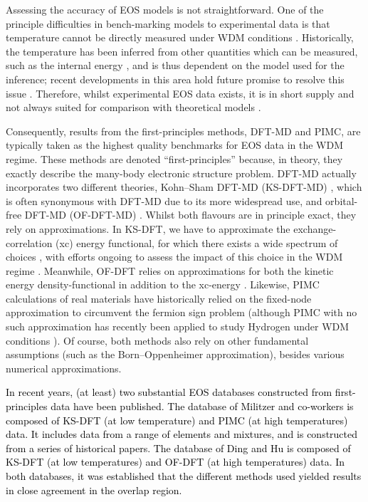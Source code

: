 \documentclass[%
 preprint,
 superscriptaddress,
 amsmath,amssymb,
longbibliography,
]{revtex4-2}
\newcommand{\change}[1]{\textcolor{black}{#1}}
\begin{document}
Assessing the accuracy of EOS models is not straightforward. One of the principle difficulties in bench-marking models to experimental data is that temperature cannot be directly measured under WDM conditions \cite{Expt_EOS_database,Kraus_XRTS,Dornheim_temperature}. Historically, the temperature has been inferred from other quantities which can be measured, such as the internal energy \cite{Expt_EOS_database}, and is thus dependent on the model used for the inference; recent developments in this area hold future promise to resolve this issue \cite{moldabekov2022_thermal,Dornheim_temperature, dornheim_imaginary-time}. Therefore, whilst experimental EOS data exists, it is in short supply and not always suited for comparison with theoretical models \cite{Expt_EOS_database}.

Consequently, results from the first-principles methods, DFT-MD and PIMC, are typically taken as the highest quality benchmarks for EOS data in the WDM regime. These methods are denoted ``first-principles'' because, in theory, they exactly describe the many-body electronic structure problem. DFT-MD actually incorporates two different theories, Kohn--Sham DFT-MD (KS-DFT-MD) \cite{ks65}, which is often synonymous with DFT-MD due to its more widespread use, and orbital-free DFT-MD (OF-DFT-MD) \cite{Carter_OFDFT_intro}. Whilst both flavours are in principle exact, they rely on approximations. In KS-DFT, we have to approximate the exchange-correlation (xc) energy functional, for which there exists a wide spectrum of choices \cite{Jacobs_ladder,Cohen_Yang_challenges,XC_review}, with efforts ongoing to assess the impact of this choice in the WDM regime \cite{Karasiev_XC,Kushal_Hydrogen,Aurora_XC_1,Aurora_XC_2,Zhandos_XC_1,Zhandos_XC_2,Callow_AA_22, moldabekov2023_assessing, moldabekov2023_non-empirical}. Meanwhile, OF-DFT relies on approximations for both the kinetic energy density-functional in addition to the xc-energy \cite{Trickey_ODDFT_challenges,Trickey_OFDFT_GGA,Levy_OFDFT,Finzel_2019,Ludena_Pauli}. Likewise, PIMC calculations of real materials have historically relied on the fixed-node approximation \cite{Ceperley1991} to circumvent the fermion sign problem \cite{Troyer_fermion_sign} (although PIMC with no such approximation has recently been applied to study Hydrogen under WDM conditions \cite{Dornheim_Hydrogen_22}). Of course, both methods also rely on other fundamental assumptions (such as the Born--Oppenheimer approximation), besides various numerical approximations. 

\change{In recent years, (at least) two substantial EOS databases constructed from first-principles data have been published. The database of Militzer and co-workers \cite{Militzer_EOS_database} is composed of KS-DFT (at low temperature) and PIMC (at high temperatures) data. It includes data from a range of elements and mixtures, and is constructed from a series of historical papers. The database of Ding and Hu \cite{Hu_Be_EOS} is composed of KS-DFT (at low temperatures) and OF-DFT (at high temperatures) data. In both databases, it was established that the different methods used yielded results in close agreement in the overlap region.} 
\end{document}
